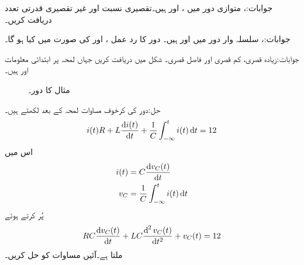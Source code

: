 جوابات:، 
متوازی  دور میں ،  اور  ہیں۔تقصیری نسبت  اور غیر تقصیری قدرتی تعدد دریافت کریں۔

جوابات:، 
سلسلہ وار  دور میں  اور  ہیں۔ دور کا رد عمل ،  اور  کی صورت میں کیا ہو گا۔

جوابات:زیادہ قصری، کم قصری اور فاصل قصری۔
شکل  میں  دریافت کریں جہاں لمحہ  پر ابتدائی معلومات  اور  ہیں۔
\begin{figure}
\centering
{}
\caption{مثال  کا دور۔}
\label{شکل_عارضی_مستطیل_دباو_الف}
\end{figure}

حل:دور کی کرخوف مساوات لمحہ  کے بعد لکھتے ہیں۔
\begin{align}\label{مساوات_عارضی_مثال_سلسلہ_وار_الف}
i(t)R+L\frac{\dif i(t)}{\dif t}+\frac{1}{C}\int_{-\infty}^t i(t) \dif t=12
\end{align} 
اس میں 
\begin{align*}
i(t)&=C\frac{\dif v_C(t)}{\dif t}\\
v_C&=\frac{1}{C}\int_{-\infty}^{t} i(t)\dif t
\end{align*}
پُر کرتے ہوئے
\begin{align}\label{مساوات_عارضی_مثال_سلسلہ_وار_ب}
RC \frac{\dif v_C(t)}{\dif t}+LC \frac{\dif^{\,2} v_C(t)}{\dif t^2}+v_C(t)=12
\end{align}
ملتا ہے۔آئیں مساوات  کو حل کریں۔


